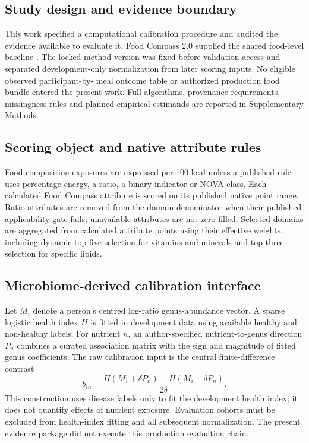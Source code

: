 \subsection*{Study design and evidence boundary}

This work specified a computational calibration procedure and audited the evidence available to evaluate it. Food Compass 2.0 supplied the shared food-level baseline \cite{barrett2024foodcompass2}. The locked
method version was fixed before validation access and separated development-only
normalization from later scoring inputs. No eligible observed participant-by-
meal outcome table or authorized production food bundle entered the present
work. Full algorithms, provenance requirements, missingness rules and planned
empirical estimands are reported in Supplementary Methods.

\subsection*{Scoring object and native attribute rules}

Food composition exposures are expressed per 100 kcal unless a published rule
uses percentage energy, a ratio, a binary indicator or NOVA class. Each
calculated Food Compass attribute is scored on its published native point range.
Ratio attributes are removed from the domain denominator when their published
applicability gate fails; unavailable attributes are not zero-filled. Selected
domains are aggregated from calculated attribute points using their effective
weights, including dynamic top-five selection for vitamins and minerals and
top-three selection for specific lipids.

\subsection*{Microbiome-derived calibration interface}

Let \(M_i\) denote a person's centred log-ratio genus-abundance vector. A sparse
logistic health index \(H\) is fitted in development data using available
healthy and non-healthy labels. For nutrient \(n\), an author-specified
nutrient-to-genus direction \(P_n\) combines a curated association matrix with
the sign and magnitude of fitted genus coefficients. The raw calibration input
is the central finite-difference contrast
\[
b_{in}=\frac{H(M_i+\delta P_n)-H(M_i-\delta P_n)}{2\delta}.
\]
This construction uses disease labels only to fit the development health index;
it does not quantify effects of nutrient exposure. Evaluation cohorts must be
excluded from health-index fitting and all subsequent normalization. The
present evidence package did not execute this production evaluation chain.

